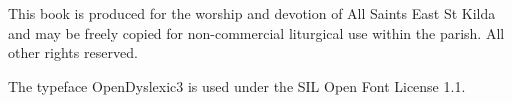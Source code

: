 \thispagestyle{copyrightpage}

This book is produced for the worship and devotion of All Saints East St Kilda and may be freely copied for non-commercial liturgical use within the parish.
All other rights reserved.

The typeface OpenDyslexic3 is used under the SIL Open Font License 1.1.

\clearpage
